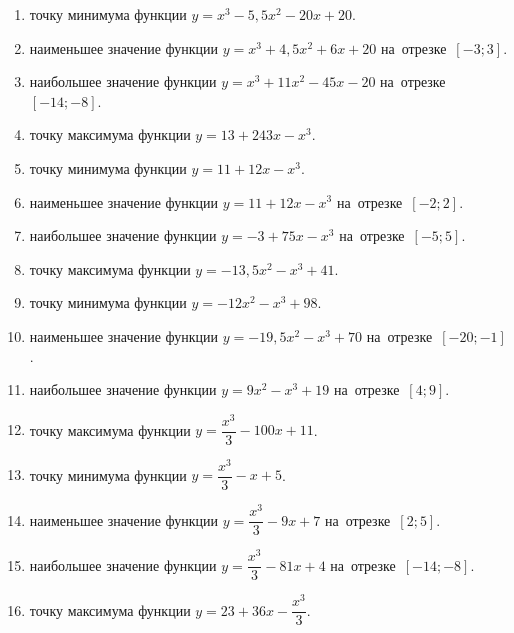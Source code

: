 \documentclass[a4paper,10pt]{article}
\begin{document}
\begin{enumerate}
\item {} точку минимума функции $y=x^3 -5,5x^2-20x+20$.

\item {} наименьшее значение функции $y=x^3 +4,5x^2+6x+20$ на~отрезке~$\left[-3;3\right]$.

\item {} наибольшее значение функции $y=x^3 +11x^2-45x-20$ на~отрезке~$\left[-14;-8\right]$.

\item {} точку максимума функции $y=13+243x-x^3$.

\item {} точку минимума функции $y=11+12x-x^3$.

\item {} наименьшее значение функции $y=11+12x-x^3$ на~отрезке~$\left[-2;2\right]$.

\item {} наибольшее значение функции $y=-3+75x-x^3$ на~отрезке~$\left[-5;5\right]$.

\item {} точку максимума функции $y=-13,5x^2-x^3+41$.

\item {} точку минимума функции $y=-12x^2-x^3+98$.

\item {} наименьшее значение функции $y=-19,5x^2-x^3+70$ на~отрезке~$\left[-20;-1\right]$.

\item {} наибольшее значение функции $y=9x^2-x^3+19$ на~отрезке~$\left[4;9\right]$.

\item {} точку максимума функции $y=\dfrac{x^3}{3} -100x+11$.

\item {} точку минимума функции $y=\dfrac{x^3}{3} -x+5$.

\item {} наименьшее значение функции $y=\dfrac{x^3}{3} -9x+7$ на~отрезке~$\left[2;5\right]$.

\item {} наибольшее значение функции $y=\dfrac{x^3}{3} -81x+4$ на~отрезке~$\left[-14;-8\right]$.

\item {} точку максимума функции $y=23 +36x-\dfrac{x^3}{3}$.


\end{enumerate}
\end{document}
